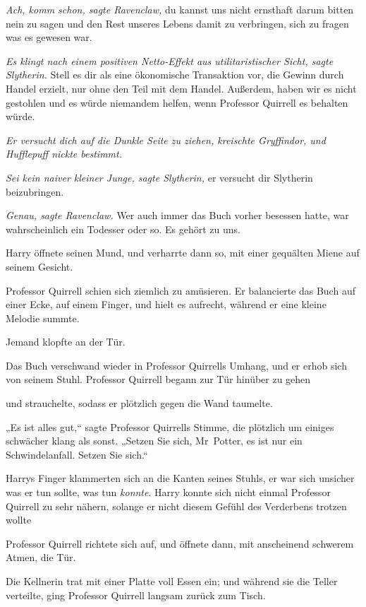 {\emph{Ach, komm schon, sagte Ravenclaw,} du kannst uns nicht ernsthaft darum bitten nein zu sagen und den Rest unseres Lebens damit zu verbringen, sich zu fragen was es gewesen war.

\emph{Es klingt nach einem positiven Netto-Effekt aus utilitaristischer Sicht, sagte Slytherin.} Stell es dir als eine ökonomische Transaktion vor, die Gewinn durch Handel erzielt, nur ohne den Teil mit dem Handel. Außerdem, haben wir es nicht gestohlen und es würde niemandem helfen, wenn Professor Quirrell es behalten würde.

\emph{Er versucht dich auf die Dunkle Seite zu ziehen, kreischte Gryffindor, und Hufflepuff nickte bestimmt.}

\emph{Sei kein naiver kleiner Junge, sagte Slytherin,} er versucht dir Slytherin beizubringen.

\emph{Genau, sagte Ravenclaw.} Wer auch immer das Buch vorher besessen hatte, war wahrscheinlich ein Todesser oder so. Es gehört zu uns.

Harry öffnete seinen Mund, und verharrte dann so, mit einer gequälten Miene auf seinem Gesicht.

Professor Quirrell schien sich ziemlich zu amüsieren. Er balancierte das Buch auf einer Ecke, auf einem Finger, und hielt es aufrecht, während er eine kleine Melodie summte.

Jemand klopfte an der Tür.

Das Buch verschwand wieder in Professor Quirrells Umhang, und er erhob sich von seinem Stuhl. Professor Quirrell begann zur Tür hinüber zu gehen \later

\later und strauchelte, sodass er plötzlich gegen die Wand taumelte.

„Es ist alles gut,“ sagte Professor Quirrells Stimme, die plötzlich um einiges schwächer klang als sonst. „Setzen Sie sich, Mr~Potter, es ist nur ein Schwindelanfall. Setzen Sie sich.“

Harrys Finger klammerten sich an die Kanten seines Stuhls, er war sich unsicher was er tun sollte, was tun \emph{konnte}. Harry konnte sich nicht einmal Professor Quirrell zu sehr nähern, solange er nicht diesem Gefühl des Verderbens trotzen wollte \later

Professor Quirrell richtete sich auf, und öffnete dann, mit anscheinend schwerem Atmen, die Tür.

Die Kellnerin trat mit einer Platte voll Essen ein; und während sie die Teller verteilte, ging Professor Quirrell langsam zurück zum Tisch.

}
